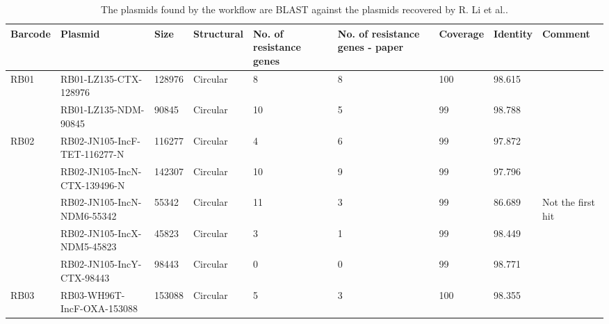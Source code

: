 \documentclass[a4paper,num-refs]{oup-contemporary}
\begin{document}
\begin{landscape}
\begin{table}
\caption{The plasmids found by the workflow are BLAST against the plasmids recovered by R. Li et al..}\label{tab:LiEtAl}
\begin{tabularx}{\linewidth}{l l l l l l l l l}
\toprule
\textbf{Barcode}         & \textbf{Plasmid}                   & \textbf{Size} & \textbf{Structural} & \textbf{No. of resistance genes} & \textbf{No. of resistance genes - paper} & \textbf{Coverage} & \textbf{Identity} & \textbf{Comment}  \\
\midrule
RB01                     & RB01-LZ135-CTX-128976              & 128976        & Circular            & 8                                & 8                                        & 100               & 98.615            &                   \\
                         & RB01-LZ135-NDM-90845               & 90845         & Circular            & 10                               & 5                                        & 99                & 98.788            &                   \\
RB02                     & RB02-JN105-IncF-TET-116277-N       & 116277        & Circular            & 4                                & 6                                        & 99                & 97.872            &                   \\
                         & RB02-JN105-IncN-CTX-139496-N       & 142307        & Circular            & 10                               & 9                                        & 99                & 97.796            &                   \\
                         & RB02-JN105-IncN-NDM6-55342         & 55342         & Circular            & 11                               & 3                                        & 99                & 86.689            & Not the first hit \\
                         & RB02-JN105-IncX-NDM5-45823         & 45823         & Circular            & 3                                & 1                                        & 99                & 98.449            &                   \\
                         & RB02-JN105-IncY-CTX-98443          & 98443         & Circular            & 0                                & 0                                        & 99                & 98.771            &                   \\
RB03                     & RB03-WH96T-IncF-OXA-153088         & 153088        & Circular            & 5                                & 3                                        & 100               & 98.355            &                   \\

\end{tabularx}
\end{table}
\end{landscape}
\end{document}
